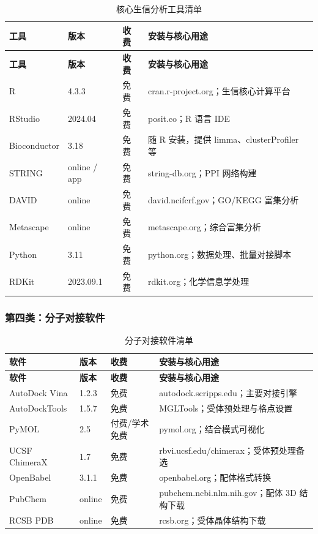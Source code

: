 \documentclass[12pt,a4paper,twoside]{article}
\begin{document}
\begin{longtable}{p{3cm}p{2.5cm}p{2cm}p{6cm}}
\caption{核心生信分析工具清单} \label{tab:bioinformatics_tools} \\
\toprule
\textbf{工具} & \textbf{版本} & \textbf{收费} & \textbf{安装与核心用途} \\
\midrule
\endfirsthead
\toprule
\textbf{工具} & \textbf{版本} & \textbf{收费} & \textbf{安装与核心用途} \\
\midrule
\endhead
\bottomrule
\endlastfoot
R & 4.3.3 & 免费 & cran.r-project.org；生信核心计算平台 \\
\addlinespace
RStudio & 2024.04 & 免费 & posit.co；R 语言 IDE \\
\addlinespace
Bioconductor & 3.18 & 免费 & 随 R 安装，提供 limma、clusterProfiler 等 \\
\addlinespace
STRING & online / app & 免费 & string-db.org；PPI 网络构建 \cite{szklarczyk2021string} \\
\addlinespace
DAVID & online & 免费 & david.ncifcrf.gov；GO/KEGG 富集分析 \\
\addlinespace
Metascape & online & 免费 & metascape.org；综合富集分析 \\
\addlinespace
Python & 3.11 & 免费 & python.org；数据处理、批量对接脚本 \\
\addlinespace
RDKit & 2023.09.1 & 免费 & rdkit.org；化学信息学处理 \\
\end{longtable}

\subsubsection{第四类：分子对接软件}

\begin{longtable}{p{3cm}p{2.5cm}p{2cm}p{6cm}}
\caption{分子对接软件清单} \label{tab:docking_tools} \\
\toprule
\textbf{软件} & \textbf{版本} & \textbf{收费} & \textbf{安装与核心用途} \\
\midrule
\endfirsthead
\toprule
\textbf{软件} & \textbf{版本} & \textbf{收费} & \textbf{安装与核心用途} \\
\midrule
\endhead
\bottomrule
\endlastfoot
AutoDock Vina & 1.2.3 & 免费 & autodock.scripps.edu；主要对接引擎 \cite{eberhardt2021autodock4} \\
\addlinespace
AutoDockTools & 1.5.7 & 免费 & MGLTools；受体预处理与格点设置 \\
\addlinespace
PyMOL & 2.5 & 付费/学术免费 & pymol.org；结合模式可视化 \\
\addlinespace
UCSF ChimeraX & 1.7 & 免费 & rbvi.ucsf.edu/chimerax；受体预处理备选 \\
\addlinespace
OpenBabel & 3.1.1 & 免费 & openbabel.org；配体格式转换 \\
\addlinespace
PubChem & online & 免费 & pubchem.ncbi.nlm.nih.gov；配体 3D 结构下载 \\
\addlinespace
RCSB PDB & online & 免费 & rcsb.org；受体晶体结构下载 \\
\end{longtable}
\end{document}
